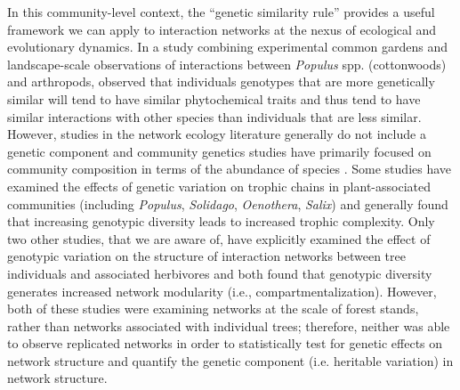 \documentclass[11pt,twocolumn,twoside,lineno]{pnas-new}
\begin{document}
In this community-level context, the ``genetic similarity rule''
provides a useful framework we can apply to interaction networks at
the nexus of ecological and evolutionary dynamics. In a study
combining experimental common gardens and landscape-scale observations
of interactions between \textit{Populus} spp.  (cottonwoods) and
arthropods, \citep{Bangert2006} observed that individuals genotypes
that are more genetically similar will tend to have similar
phytochemical traits and thus tend to have similar interactions with
other species than individuals that are less similar. However, studies
in the network ecology literature generally do not include a genetic
component \cite{Lau2017a} and community genetics studies have
primarily focused on community composition in terms of the abundance
of species \cite{DesRoches2018TheVariation}. Some studies have
examined the effects of genetic variation on trophic chains in
plant-associated communities (including \textit{Populus},
\textit{Solidago}, \textit{Oenothera}, \textit{Salix})
\cite{Bailey2005ImportanceInteractions, Johnson2008, Smith2011,
  Smith2015b, Barbour2016GeneticComplexity} and generally found that
increasing genotypic diversity leads to increased trophic
complexity. Only two other studies, that we are aware of, have
explicitly examined the effect of genotypic variation on the structure
of interaction networks between tree individuals and associated
herbivores \cite{Lau2015a, Keith2017} and both found that genotypic
diversity generates increased network modularity (i.e.,
compartmentalization).  However, both of these studies were examining
networks at the scale of forest stands, rather than networks
associated with individual trees; therefore, neither was able to
observe replicated networks in order to statistically test for genetic
effects on network structure and quantify the genetic component
(i.e. heritable variation) in network structure.
\end{document}
